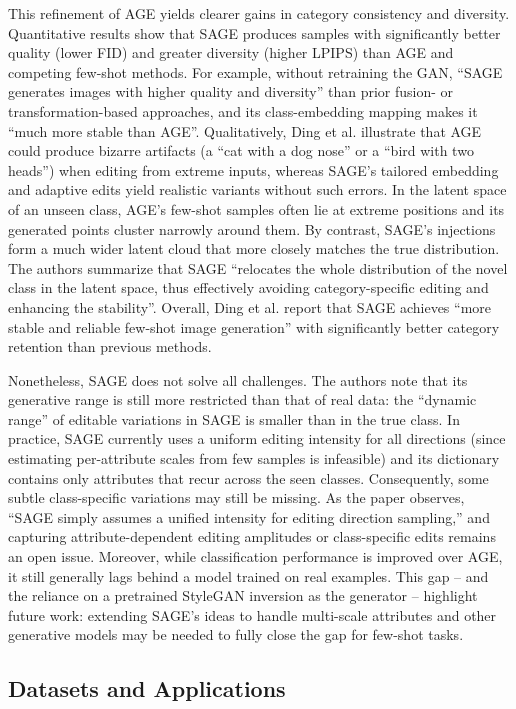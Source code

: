 This refinement of AGE yields clearer gains in category consistency and diversity. Quantitative results show that SAGE 
produces samples with significantly better quality (lower FID) and greater diversity (higher LPIPS) than AGE and competing 
few-shot methods. For example, without retraining the GAN, “SAGE generates images with higher quality and diversity” than 
prior fusion- or transformation-based approaches, and its class-embedding mapping makes it “much more stable than AGE”. 
Qualitatively, Ding et al. illustrate that AGE could produce bizarre artifacts (a “cat with a dog nose” or a “bird with 
two heads”) when editing from extreme inputs, whereas SAGE’s tailored embedding and adaptive edits yield realistic variants 
without such errors. In the latent space of an unseen class, AGE’s few-shot samples often lie at extreme positions and its 
generated points cluster narrowly around them. By contrast, SAGE’s injections form a much wider latent cloud that more 
closely matches the true distribution. The authors summarize that SAGE “relocates the whole distribution of the novel class 
in the latent space, thus effectively avoiding category-specific editing and enhancing the stability”. Overall, Ding et al. 
report that SAGE achieves “more stable and reliable few-shot image generation” with significantly better category retention 
than previous methods.

Nonetheless, SAGE does not solve all challenges. The authors note that its generative range is still more restricted 
than that of real data: the “dynamic range” of editable variations in SAGE is smaller than in the true class. 
In practice, SAGE currently uses a uniform editing intensity for all directions (since estimating per-attribute scales 
from few samples is infeasible) and its dictionary contains only attributes that recur across the seen classes. 
Consequently, some subtle class-specific variations may still be missing. As the paper observes, “SAGE simply assumes 
a unified intensity for editing direction sampling,” and capturing attribute-dependent editing amplitudes or class-specific 
edits remains an open issue. Moreover, while classification performance is improved over AGE, it still generally lags behind 
a model trained on real examples. This gap – and the reliance on a pretrained StyleGAN inversion as the generator – highlight 
future work: extending SAGE’s ideas to handle multi-scale attributes and other generative models may be needed to fully 
close the gap for few-shot tasks.

\subsection{Datasets and Applications}

